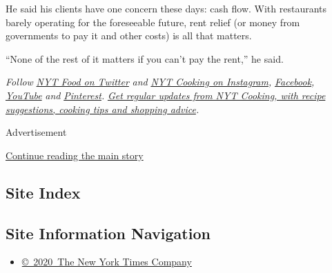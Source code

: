 He said his clients have one concern these days: cash flow. With
restaurants barely operating for the foreseeable future, rent relief (or
money from governments to pay it and other costs) is all that matters.

``None of the rest of it matters if you can't pay the rent,'' he said.

\emph{Follow} \href{https://twitter.com/nytfood}{\emph{NYT Food on
Twitter}} \emph{and}
\href{https://www.instagram.com/nytcooking/}{\emph{NYT Cooking on
Instagram}}\emph{,}
\href{https://www.facebookcorewwwi.onion/nytcooking/}{\emph{Facebook}}\emph{,}
\href{https://www.youtube.com/nytcooking}{\emph{YouTube}} \emph{and}
\href{https://www.pinterest.com/nytcooking/}{\emph{Pinterest}}\emph{.}
\href{https://www.nytimes3xbfgragh.onion/newsletters/cooking}{\emph{Get
regular updates from NYT Cooking, with recipe suggestions, cooking tips
and shopping advice}}\emph{.}

Advertisement

\protect\hyperlink{after-bottom}{Continue reading the main story}

\hypertarget{site-index}{%
\subsection{Site Index}\label{site-index}}

\hypertarget{site-information-navigation}{%
\subsection{Site Information
Navigation}\label{site-information-navigation}}

\begin{itemize}
\tightlist
\item
  \href{https://help.nytimes3xbfgragh.onion/hc/en-us/articles/115014792127-Copyright-notice}{©~2020~The
  New York Times Company}
\end{itemize}

